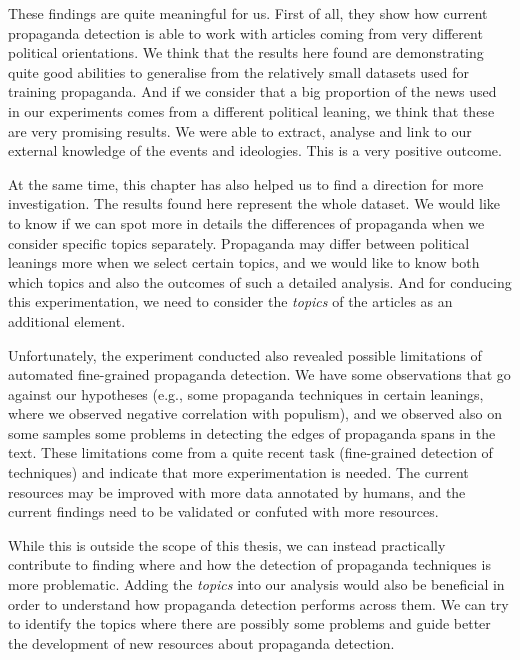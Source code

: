 These findings are quite meaningful for us.
First of all, they show how current propaganda detection is able to work with articles coming from very different political orientations. We think that the results here found are demonstrating quite good abilities to generalise from the relatively small datasets used for training propaganda.
And if we consider that a big proportion of the news used in our experiments comes from a different political leaning, we think that these are very promising results.
We were able to extract, analyse and link to our external knowledge of the events and ideologies. This is a very positive outcome.

At the same time, this chapter has also helped us to find a direction for more investigation. The results found here represent the whole dataset. We would like to know if we can spot more in details the differences of propaganda when we consider specific topics separately. Propaganda may differ between political leanings more when we select certain topics, and we would like to know both which topics and also the outcomes of such a detailed analysis. And for conducing this experimentation, we need to consider the \emph{topics} of the articles as an additional element.

Unfortunately, the experiment conducted also revealed possible limitations of automated fine-grained propaganda detection.
We have some observations that go against our hypotheses (e.g., some propaganda techniques in certain leanings, where we observed negative correlation with populism), and we observed also on some samples some problems in detecting the edges of propaganda spans in the text.
These limitations come from a quite recent task (fine-grained detection of techniques) and indicate that more experimentation is needed. The current resources may be improved with more data annotated by humans, and the current findings need to be validated or confuted with more resources.

While this is outside the scope of this thesis, we can instead practically contribute to finding where and how the detection of propaganda techniques is more problematic.
Adding the \emph{topics} into our analysis would also be beneficial in order to understand how propaganda detection performs across them.
We can try to identify the topics where there are possibly some problems and guide better the development of new resources about propaganda detection.


